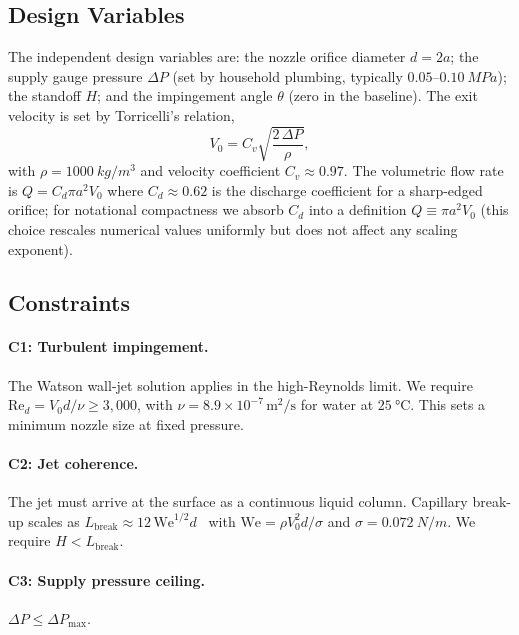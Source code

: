 \documentclass[aps,prfluids,reprint,amsmath,amssymb,floatfix]{revtex4-2}
\newcommand{\Rey}{\mathrm{Re}}
\newcommand{\We}{\mathrm{We}}
\begin{document}
\subsection{Design Variables}

The independent design variables are: the nozzle orifice diameter
$d = 2a$; the supply gauge pressure $\Delta P$ (set by household plumbing,
typically $0.05$--$\SI{0.10}{MPa}$); the standoff $H$; and the impingement
angle $\theta$ (zero in the baseline). The exit velocity is set by
Torricelli's relation,
\begin{equation}
  V_0 = C_v \sqrt{\frac{2\,\Delta P}{\rho}},
  \label{eq:torricelli}
\end{equation}
with $\rho = \SI{1000}{kg/m^3}$ and velocity coefficient $C_v \approx 0.97$.
The volumetric flow rate is $Q = C_d \pi a^2 V_0$ where $C_d \approx 0.62$
is the discharge coefficient for a sharp-edged orifice; for notational
compactness we absorb $C_d$ into a definition $Q \equiv \pi a^2 V_0$ (this
choice rescales numerical values uniformly but does not affect any scaling
exponent).

\subsection{Constraints}

\paragraph{C1: Turbulent impingement.}
The Watson wall-jet solution applies in the high-Reynolds limit. We require
$\Rey_d = V_0 d/\nu \geq 3{,}000$, with $\nu = 8.9\times 10^{-7}\,\mathrm{m^2/s}$
for water at $\SI{25}{\degreeCelsius}$. This sets a minimum nozzle size at
fixed pressure.

\paragraph{C2: Jet coherence.}
The jet must arrive at the surface as a continuous liquid column. Capillary
break-up scales as $L_\mathrm{break} \approx 12\,\We^{1/2} d$~\citep{Lefebvre1988}
with $\We = \rho V_0^2 d/\sigma$ and $\sigma = \SI{0.072}{N/m}$. We require
$H < L_\mathrm{break}$.

\paragraph{C3: Supply pressure ceiling.}
$\Delta P \leq \Delta P_\mathrm{max}$.
\end{document}
